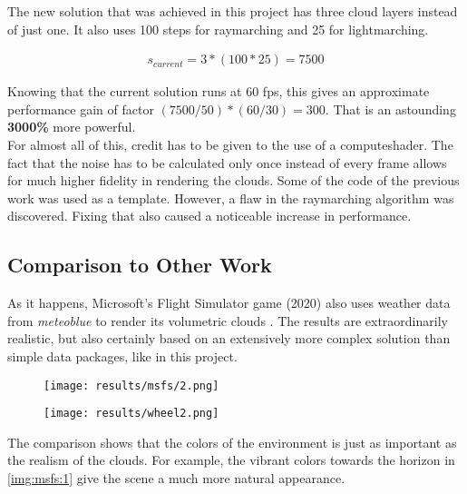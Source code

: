 \noindent
The new solution that was achieved in this project has three cloud layers instead of just one.
It also uses 100 steps for \gls{raymarching} and 25 for \gls{lightmarching}.

$$
\begin{array}{l}
    s_{current} = 3 * (100 * 25) = 7500
\end{array}
$$

\noindent
Knowing that the current solution runs at 60 \gls{fps}, this gives an approximate performance gain of factor $(7500 / 50) * (60/30) = 300$.
That is an astounding \textbf{3000\%} more powerful.
\\
For almost all of this, credit has to be given to the use of a \gls{computeshader}.
The fact that the \gls{noise} has to be calculated only once instead of every frame allows for much higher fidelity in rendering the clouds.
\emptyline
Some of the code of the previous work was used as a template.
However, a flaw in the \gls{raymarching} algorithm was discovered.
Fixing that also caused a noticeable increase in performance.

\subsection{Comparison to Other Work}
As it happens, Microsoft's Flight Simulator game (2020) also uses weather data from \emph{meteoblue} to render its \gls{volumetric} clouds \cite{meteoblue:msfs}.
The results are extraordinarily realistic, but also certainly based on an extensively more complex solution than simple data packages, like in this project.

\begin{figure}[H]
    \centering
        \begin{minipage}{0.47\linewidth}
            \texttt{[image: results/msfs/2.png]}
            \label{img:msfs:1}
        \end{minipage}
    \hfill
        \begin{minipage}{0.47\linewidth}
            \texttt{[image: results/wheel2.png]}
            \label{img:msfs:2}
        \end{minipage}
\end{figure}

\noindent
The comparison shows that the colors of the environment is just as important as the realism of the clouds.
For example, the vibrant colors towards the horizon in \autoref{img:msfs:1} give the scene a much more natural appearance.